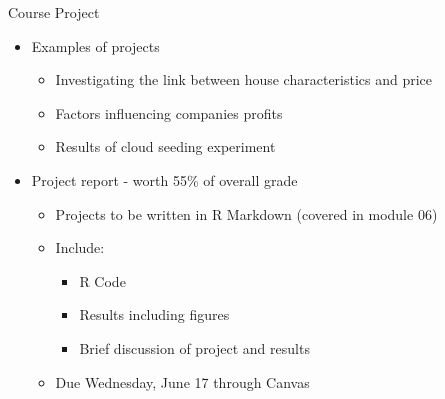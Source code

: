 \documentclass[aspectratio=169]{beamer}\usepackage[]{graphicx}\usepackage[]{color}
\begin{document}
\begin{frame}{Course Project}
\begin{itemize}
  \item Examples of projects
  \begin{itemize}
  	\item Investigating the link between house characteristics and price
  	\item Factors influencing companies profits
  	\item Results of cloud seeding experiment
  \end{itemize}
  \item Project report - worth 55\% of overall grade
  \begin{itemize}
  	\item Projects to be written in R Markdown (covered in module 06)
  	\item Include:
  	\begin{itemize}
  		\item R Code
      \item Results including figures
      \item Brief discussion of project and results
  	\end{itemize}
  	\item Due Wednesday, June 17 through Canvas
  \end{itemize}
\end{itemize}
\end{frame}
\end{document}
